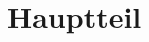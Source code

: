 \documentclass[
    fontsize=12pt,
    headings=small,
    parskip=half,           %
    bibliography=totoc,
    numbers=noenddot,       %
    open=any,               %
    ]{scrreprt}
\begin{document}
%


\chapter{Hauptteil}
\end{document}
